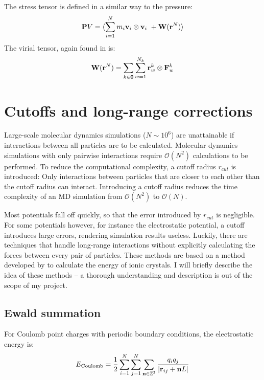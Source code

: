 The stress tensor is defined in a similar way to the pressure:
\begin{equation}
	\mathbf{P} V = \langle \sum_{i=1}^N m_i \mathbf{v}_i \otimes \mathbf{v}_i \ + \mathbf{W}(\mathbf{r}^N)\rangle
\end{equation}
The virial tensor, again found in \citet{Thompson2009} is:
\begin{equation}
	\mathbf{W}(\mathbf{r}^N) = \sum_{k \in \mathbf{0}} \sum_{w=1}^{N_k} \mathbf{r}_w^k \otimes \mathbf{F}^k_w
\end{equation}

\section{Cutoffs and long-range corrections}
Large-scale molecular dynamics simulations ($N \sim 10^6$) are unattainable if interactions between all particles are to be calculated. Molecular dynamics simulations with only pairwise interactions require $\mathcal{O}(N^2)$ calculations to be performed. To reduce the computational complexity, a cutoff radius $r_{cut}$ is introduced: Only interactions between particles that are closer to each other than the cutoff radius can interact. Introducing a cutoff radius reduces the time complexity of an MD simulation from $\mathcal{O}(N^2)$ to $\mathcal{O}(N)$. 

Most potentials fall off quickly, so that the error introduced by $r_{cut}$ is negligible. For some potentials however, for instance the electrostatic potential, a cutoff introduces large errors, rendering simulation results useless. Luckily, there are techniques that handle long-range interactions without explicitly calculating the forces between every pair of particles. These methods are based on a method developed by \citet{ANDP:ANDP19213690304} to calculate the energy of ionic crystals. I will briefly describe the idea of these methods -- a thorough understanding and description is out of the scope of my project.

\subsection{Ewald summation}
For Coulomb point charges with periodic boundary conditions, the electrostatic energy is:
\begin{equation}
	E_{\text{Coulomb}} = \frac{1}{2} \sum_{i=1}^N\sum_{j=1}^N \sum_{\mathbf{n} \in \mathbb{Z}^3} \frac{q_iq_j}{|\mathbf{r}_{ij}+\mathbf{n} L|} 
\end{equation}

